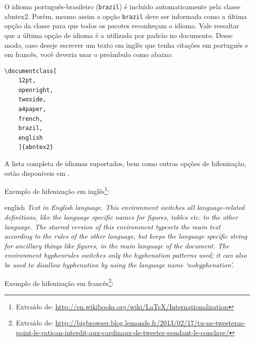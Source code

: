 O idioma português-brasileiro (\texttt{brazil}) é incluído automaticamente pela
classe \textsf{abntex2}. Porém, mesmo assim a opção \texttt{brazil} deve ser
informada como a última opção da classe para que todos os pacotes reconheçam o
idioma. Vale ressaltar que a última opção de idioma é a utilizada por padrão no
documento. Desse modo, caso deseje escrever um texto em inglês que tenha
citações em português e em francês, você deveria usar o preâmbulo como abaixo:

\begin{verbatim}
\documentclass[
	12pt,
	openright,
	twoside,
	a4paper,
	french,
	brazil,
	english
	]{abntex2}
\end{verbatim}

A lista completa de idiomas suportados, bem como outras opções de hifenização,
estão disponíveis em \textcite{babel}.

Exemplo de hifenização em inglês\footnote{Extraído de:
\url{http://en.wikibooks.org/wiki/LaTeX/Internationalization}}:

\begin{otherlanguage*}{english}
\textit{Text in English language. This environment switches all language-related
definitions, like the language specific names for figures, tables etc. to the other
language. The starred version of this environment typesets the main text
according to the rules of the other language, but keeps the language specific
string for ancillary things like figures, in the main language of the document.
The environment hyphenrules switches only the hyphenation patterns used; it can
also be used to disallow hyphenation by using the language name
`nohyphenation'.}
\end{otherlanguage*}

Exemplo de hifenização em francês\footnote{Extraído de:
\url{http://bigbrowser.blog.lemonde.fr/2013/02/17/tu-ne-tweeteras-point-le-vatican-interdit-aux-cardinaux-de-tweeter-pendant-le-conclave/}}:



